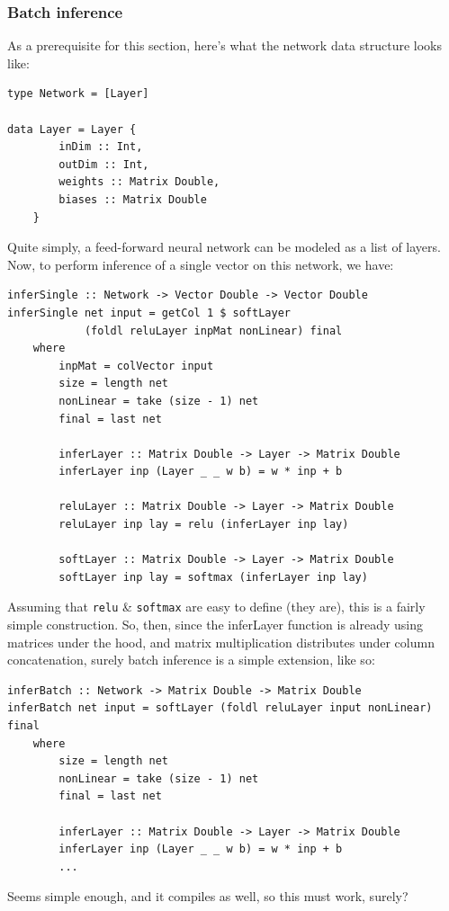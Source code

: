 \documentclass[12pt]{article}
\begin{document}
\subsubsection{Batch inference}
As a prerequisite for this section, here's what the network data structure looks like:
\begin{lstlisting}
type Network = [Layer]

data Layer = Layer {
		inDim :: Int,
		outDim :: Int,
		weights :: Matrix Double,
		biases :: Matrix Double
	}
\end{lstlisting}
Quite simply, a feed-forward neural network can be modeled as a list of layers. Now, to perform inference of a single vector on this network, we have:
\begin{lstlisting}
inferSingle :: Network -> Vector Double -> Vector Double
inferSingle net input = getCol 1 $ softLayer 
			(foldl reluLayer inpMat nonLinear) final
	where
		inpMat = colVector input
		size = length net
		nonLinear = take (size - 1) net
		final = last net

		inferLayer :: Matrix Double -> Layer -> Matrix Double
		inferLayer inp (Layer _ _ w b) = w * inp + b

		reluLayer :: Matrix Double -> Layer -> Matrix Double
		reluLayer inp lay = relu (inferLayer inp lay)

		softLayer :: Matrix Double -> Layer -> Matrix Double
		softLayer inp lay = softmax (inferLayer inp lay)
\end{lstlisting}
Assuming that \verb|relu| \& \verb|softmax| are easy to define (they are), this is a fairly simple construction. So, then, since the inferLayer function is already using matrices under the hood, and matrix multiplication distributes under column concatenation, surely batch inference is a simple extension, like so:
\begin{lstlisting}
inferBatch :: Network -> Matrix Double -> Matrix Double
inferBatch net input = softLayer (foldl reluLayer input nonLinear) final
	where
		size = length net
		nonLinear = take (size - 1) net
		final = last net

		inferLayer :: Matrix Double -> Layer -> Matrix Double
		inferLayer inp (Layer _ _ w b) = w * inp + b
		...
\end{lstlisting}
Seems simple enough, and it compiles as well, so this must work, surely?
\end{document}
